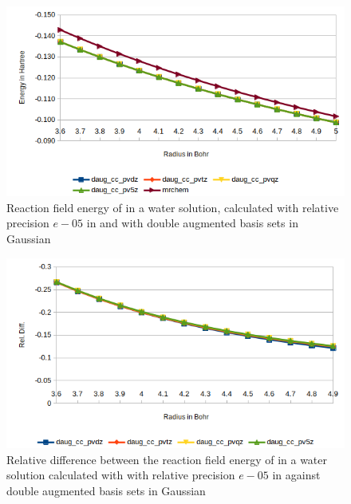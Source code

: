 \documentclass[../master_thesis.tex]{subfiles}
\begin{document}
\begin{figure}[!htb]
  \centering
    \includegraphics[width=0.75\linewidth]{img/Erdauglip.png}
  \caption[Reaction field energy of ]{Reaction field energy of  in a water solution, calculated with relative precision $e-05$ in \mrchem  and with double augmented basis sets in Gaussian}
  \label{fig:lipEnergyplotsdaug}
\end{figure}



\begin{figure}[!htb]
  \centering
    \includegraphics[width=\linewidth]{img/watdaugreldiff.png}
  \caption[Relative difference of  against Gaussian double augmented results]{Relative difference between the reaction field energy of  in a water solution calculated with with relative precision $e-05$ in \mrchem
   against double augmented basis sets in Gaussian}
  \label{fig:watreldiffdaug}
\end{figure}
\end{document}
